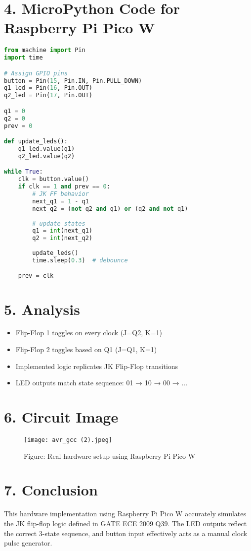 \documentclass[12pt]{article}
\begin{document}
\begin{multicols}{2}
\end{multicols}

\newpage
\section*{4. MicroPython Code for Raspberry Pi Pico W}
\begin{lstlisting}[language=Python]
from machine import Pin
import time

# Assign GPIO pins
button = Pin(15, Pin.IN, Pin.PULL_DOWN)
q1_led = Pin(16, Pin.OUT)
q2_led = Pin(17, Pin.OUT)

q1 = 0
q2 = 0
prev = 0

def update_leds():
    q1_led.value(q1)
    q2_led.value(q2)

while True:
    clk = button.value()
    if clk == 1 and prev == 0:
        # JK FF behavior
        next_q1 = 1 - q1
        next_q2 = (not q2 and q1) or (q2 and not q1)
        
        # update states
        q1 = int(next_q1)
        q2 = int(next_q2)
        
        update_leds()
        time.sleep(0.3)  # debounce

    prev = clk
\end{lstlisting}

\section*{5. Analysis}
\begin{itemize}
    \item Flip-Flop 1 toggles on every clock (J=Q2, K=1)
    \item Flip-Flop 2 toggles based on Q1 (J=Q1, K=1)
    \item Implemented logic replicates JK Flip-Flop transitions
    \item LED outputs match state sequence: 01 → 10 → 00 → ...
\end{itemize}

\section*{6. Circuit Image}
\begin{figure}[H]
    \centering
    \texttt{[image: avr\_gcc (2).jpeg]} %
    \caption*{Figure: Real hardware setup using Raspberry Pi Pico W}
\end{figure}

\section*{7. Conclusion}
This hardware implementation using Raspberry Pi Pico W accurately simulates the JK flip-flop logic defined in GATE ECE 2009 Q39. The LED outputs reflect the correct 3-state sequence, and button input effectively acts as a manual clock pulse generator.
\end{document}
